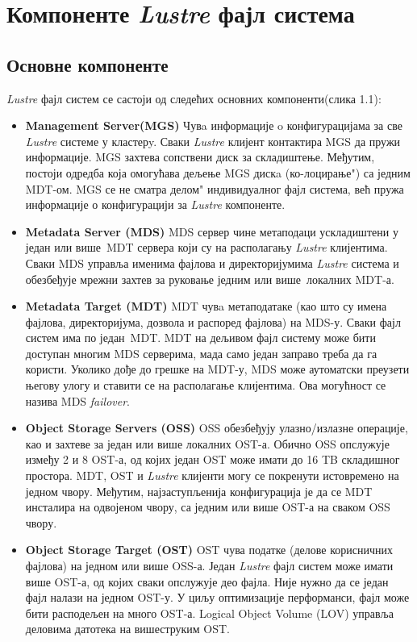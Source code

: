 \newpage
\section{Компоненте  \textit{Lustre}  фајл система}
\subsection{Основне компоненте}
\textit{Lustre} фајл систем се састоји од следећих основних компоненти(слика 1.1):
\begin{itemize}
\item
\textbf{Management Server(MGS)} 
 Чувa информације o конфигурацијама за све \textit{Lustre} системе у кластерy. Сваки \textit{Lustre} клијент контактира MGS да пружи информације. MGS захтева сопствени диск за складиштење. Међутим, постоји одредба која омогућава дељење MGS дискa (\zn ко-лоцирање") са једним MDT-ом. MGS се не сматра \zn делом" индивидуалног фајл система, већ пружа информације о конфигурацији за \textit{Lustre} компоненте.
 
\item 
\textbf{Metadata Server (\gls{MDS})} 
 MDS сервер чине метаподаци ускладиштени у један или више MDT сервера који су на располагању \textit{Lustre} клијентима. Сваки MDS  управља именима фајлова и директоријумима \textit{Lustre} система и обезбеђује мрежни захтев за руковање једним или више локалних MDT-а.

\item 
\textbf{Metadata Target (\gls{MDT})} 
 MDT чувa метаподатаке (као што су имена фајлова, директоријума, дозвола и распоред фајлова) на MDS-у. Сваки фајл систем има по један MDT. MDT на дељивом фајл систему може бити доступан многим MDS серверима, мада само један заправо треба да га користи. Уколико дође до грешке на MDT-у, MDS може аутоматски преузети његову улогу и ставити се на располагање клијентима. Ова могућност се назива MDS \textit{ failover}.

\item 
\textbf{Object Storage Servers (\gls{OSS})} 
 OSS обезбеђују улазно/излазне операције, као и захтеве за један или више локалних OST-а. Обично OSS опслужује између 2 и 8 OST-а, од којих један OST може имати до 16 TB складишног простора.  MDT, OST и \textit{Lustre} клијенти могу се покренути истовремено на једном чвору. Међутим, најзаступљенија конфигурација је да се MDT инсталира на одвојеном чвору, са једним или више OST-а на сваком OSS чвору.

\item 
\textbf{Object Storage Target (\gls{OST})} 
 OST чува податке (делове корисничних фајлова) на једном или више OSS-а. Један \textit{Lustre} фајл систем може имати више OST-а, од којих сваки опслужује део фајла. Није нужно да се један фајл налази на једном OST-у. У циљу оптимизације перформанси, фајл може бити расподељен на много OST-а. Logical Object Volume (LOV) управља деловима датотека на вишеструким OST.


\end{itemize}
